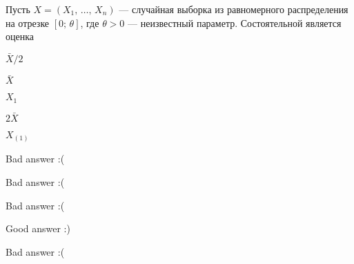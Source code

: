 
\begin{question}
Пусть \(X = (X_1, \, \ldots, \, X_n)\) --- случайная выборка из
равномерного распределения на отрезке \([0; \, \theta]\), где
\(\theta > 0\) --- неизвестный параметр. Состоятельной является оценка
\begin{answerlist}
  \item \(\bar{X} / 2\)
  \item \(\bar{X}\)
  \item \(X_{1}\)
  \item \(2 \bar{X}\)
  \item \(X_{(1)}\)
\end{answerlist}
\end{question}

\begin{solution}
\begin{answerlist}
  \item Bad answer :(
  \item Bad answer :(
  \item Bad answer :(
  \item Good answer :)
  \item Bad answer :(
\end{answerlist}
\end{solution}

